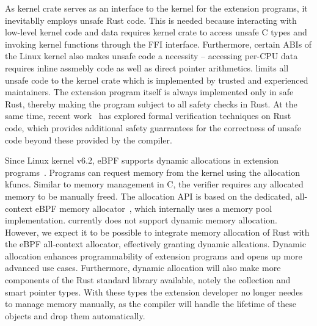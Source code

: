 As \projname{} kernel crate serves as an interface to the kernel for the
    extension programs, it inevitablly employs unsafe Rust code.
This is needed because interacting with low-level kernel code and data requires
    kernel crate to access unsafe C types and invoking kernel functions through
    the FFI interface.
Furthermore, certain ABIs of the Linux kernel also makes unsafe code a
    necessity -- accessing per-CPU data requires inline assmebly code as well
    as direct pointer arithmetics.
\projname{} limits all unsafe code to the kernel crate which is implemented by
    trusted and experienced maintainers.
The extension program itself is always implemented only in safe Rust, thereby
    making the program subject to all safety checks in Rust.
At the same time, recent work~\cite{verus} has explored formal verification
    techniques on Rust code, which provides additional safety guarrantees
    for the correctness of unsafe code beyond these provided by the compiler.

Since Linux kernel v6.2, eBPF supports dynamic allocations in extension
    programs~\cite{Dwivedi-958cf2e273f0}.
Programs can request memory from the kernel using the allocation kfuncs.
Similar to memory management in C, the verifier requires any allocated memory
    to be manually freed.
The allocation API is based on the dedicated, all-context eBPF memory
    allocator~\cite{bpf-mempool-lwn}, which internally uses a memory pool
    implementation.
\projname{} currently does not support dynamic memory allocation.
However, we expect it to be possible to integrate memory allocation of Rust
    with the eBPF all-context allocator, effectively granting \projname{}
    dynamic allcations.
Dynamic allocation enhances programmability of extension programs and opens
    up more advanced use cases.
Furthermore, dynamic allocation will also make more components of the Rust
    standard library available, notely the collection and smart pointer types.
With these types the extension developer no longer needes to manage memory
    manually, as the compiler will handle the lifetime of these objects and
    drop them automatically.

